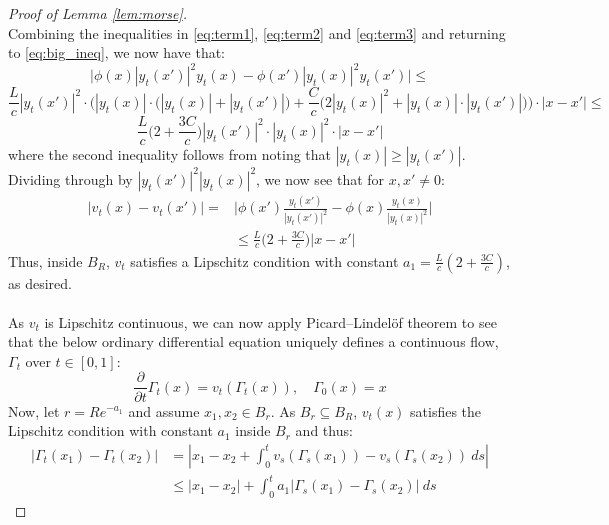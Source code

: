 \documentclass[11pt]{article}
\newcommand{\1}{\mathbf{1}}
\theoremstyle{definition}
\theoremstyle{remark}
\begin{document}
\begin{proof}[Proof of Lemma \ref{lem:morse}]
\\
Combining the inequalities in \eqref{eq:term1}, \eqref{eq:term2} and \eqref{eq:term3} and returning to \eqref{eq:big_ineq}, we now have that:
\begin{equation}\nonumber
        \bigg|\phi(x)|y_t(x')|^2 y_t(x)-\phi(x')|y_t(x)|^2 y_t(x')\bigg| \leq 
\end{equation}
\begin{equation}\nonumber
        \frac{L}{c}|y_t(x')|^2 \cdot \bigg( |y_t(x)| \cdot\bigg(|y_t(x)|+|y_t(x')|\bigg) + 
        \frac{C}{c}\bigg(2|y_t(x)|^2 + |y_t(x)|\cdot|y_t(x')|\bigg)\bigg)\cdot |x-x'| \leq
\end{equation}
\begin{equation}\nonumber
        \frac{L}{c}\bigg( 2 + 
        \frac{3C}{c}\bigg)|y_t(x')|^2 \cdot |y_t(x)|^2\cdot |x-x'|
\end{equation}
where the second inequality follows from noting that $|y_t(x)|\geq |y_t(x')|$. Dividing through by $|y_t(x')|^2|y_t(x)|^2$, we now see that for $x,x'\neq 0$:
\begin{equation}\nonumber
\begin{split}
    |v_t(x)-v_t(x')| = & \bigg|\phi(x')\frac{y_t(x')}{|y_t(x')|^2}-\phi(x)\frac{y_t(x)}{|y_t(x)|^2}\bigg|\\
    & \leq \frac{L}{c}\bigg( 2 + 
        \frac{3C}{c}\bigg) |x-x'|
\end{split}
\end{equation}
Thus, inside $B_R$, $v_t$ satisfies a Lipschitz condition with constant $a_1=\frac{L}{c}( 2 + \frac{3C}{c})$, as desired.\\
\\
As $v_t$ is Lipschitz continuous, we can now apply Picard–Lindel\"{o}f theorem to see that the below ordinary differential equation uniquely defines a continuous flow, $\Gamma_t$ over $t\in [0,1]$: 
\begin{equation}\nonumber
    \frac{\partial }{\partial t}\Gamma_t(x) = v_t(\Gamma_t(x)), \quad \Gamma_0(x)=x
\end{equation}
Now, let $r = Re^{-a_1}$ and assume $x_1,x_2 \in B_r$. As $B_r \subseteq B_R$, $v_t(x)$ satisfies the Lipschitz condition with constant $a_1$ inside $B_r$ and thus:
\begin{align*}
|\Gamma_t(x_1) - \Gamma_t(x_2)| &= \left|x_1 - x_2 + \int_0^t v_s(\Gamma_s(x_1))-v_s(\Gamma_s(x_2))\ ds\right| \\
&\leq |x_1 - x_2| + \int_0^t a_1|\Gamma_s(x_1)- \Gamma_s(x_2)|\ ds
\end{align*}

\end{proof}
\end{document}
